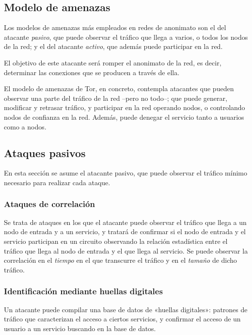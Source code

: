\documentclass[
  a4paper,
  12pt,
  spanish,
]{scrartcl}
\begin{document}
\subsection{Modelo de amenazas}

Los modelos de amenazas más empleados en redes de anonimato son el del atacante \emph{pasivo},
que puede observar el tráfico que llega a varios, o todos los nodos de la red; y el del
atacante \emph{activo}, que además puede participar en la red.

El objetivo de este atacante será romper el anonimato de la red, es decir, determinar las conexiones
que se producen a través de ella.

El modelo de amenazas de Tor, en concreto, contempla atacantes que pueden observar una parte del tráfico
de la red --pero no todo--; que puede generar, modificar y retrasar tráfico, y participar en la red
operando nodos, o controlando nodos de confianza en la red. Además, puede denegar el servicio tanto a usuarios
como a nodos.

\subsection{Ataques pasivos}

En esta sección se asume el atacante pasivo, que puede observar el tráfico mínimo necesario
para realizar cada ataque.

\subsubsection{Ataques de correlación}

Se trata de ataques en los que el atacante puede observar el tráfico que llega a
un nodo de entrada y a un servicio, y tratará de confirmar si el nodo de entrada y
el servicio participan en un circuito observando la relación estadística entre el
tráfico que llega al nodo de entrada y el que llega al servicio. Se puede observar
la correlación en el \emph{tiempo} en el que transcurre el tráfico y en el \emph{tamaño}
de dicho tráfico.

\subsubsection{Identificación mediante huellas digitales}

Un atacante puede compilar una base de datos de «huellas digitales»: patrones de tráfico que caracterizan
el acceso a ciertos servicios, y confirmar el acceso de un usuario a un servicio buscando en la base
de datos.
\end{document}
